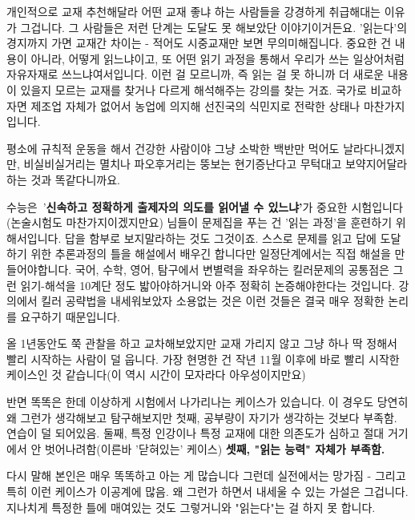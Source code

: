 개인적으로 교재 추천해달라 어떤 교재 좋냐 하는 사람들을 강경하게 취급해대는 이유가 그겁니다.
그 사람들은 저런 단계는 도달도 못 해보았단 이야기이거든요. '읽는다'의 경지까지 가면 교재간 차이는 - 적어도 시중교재만 보면 무의미해집니다.
중요한 건 내용이 아니라, 어떻게 읽느냐이고, 또 어떤 읽기 과정을 통해서 우리가 쓰는 일상어처럼 자유자재로 쓰느냐여서입니다.
이런 걸 모르니까, 즉 읽는 걸 못 하니까 더 새로운 내용이 있을지 모르는 교재를 찾거나 다르게 해석해주는 강의를 찾는 거죠.
국가로 비교하자면 제조업 자체가 없어서 농업에 의지해 선진국의 식민지로 전락한 상태나 마찬가지입니다.
\vspace{5mm}

평소에 규칙적 운동을 해서 건강한 사람이야 그냥 소박한 백반만 먹어도 날라다니겠지만,
비실비실거리는 멸치나 파오후거리는 뚱보는 현기증난다고 무턱대고 보약지어달라하는 것과 똑같다니까요.
\vspace{5mm}

수능은 '\textbf{신속하고 정확하게 출제자의 의도를 읽어낼 수 있느냐'}가 중요한 시험입니다(논술시험도 마찬가지이겠지만요)
님들이 문제집을 푸는 건 '읽는 과정'을 훈련하기 위해서입니다. 답을 함부로 보지말라하는 것도 그것이죠.
스스로 문제를 읽고 답에 도달하기 위한 추론과정의 틀을 해설에서 배우긴 합니다만 일정단계에서는 직접 해설을 만들어야합니다.
국어, 수학, 영어, 탐구에서 변별력을 좌우하는 킬러문제의 공통점은
그런 읽기-해석을 10계단 정도 밟아야하거니와 아주 정확히 논증해야한다는 것입니다.
강의에서 킬러 공략법을 내세워보았자 소용없는 것은 이런 것들은 결국 매우 정확한 논리를 요구하기 때문입니다.
\vspace{5mm}

올 1년동안도 쭉 관찰을 하고 교차해보았지만
교재 가리지 않고 그냥 하나 딱 정해서 빨리 시작하는 사람이 덜 웁니다.
가장 현명한 건 작년 11월 이후에 바로 빨리 시작한 케이스인 것 같습니다(이 역시 시간이 모자라다 아우성이지만요)
\vspace{5mm}

반면 똑똑은 한데 이상하게 시험에서 나가리나는 케이스가 있습니다. 이 경우도 당연히 왜 그런가 생각해보고 탐구해보지만
첫째, 공부량이 자기가 생각하는 것보다 부족함. 연습이 덜 되어있음.
둘째, 특정 인강이나 특정 교재에 대한 의존도가 심하고 절대 거기에서 안 벗어나려함(이른바 '닫혀있는' 케이스)
\textbf{셋째, "읽는 능력" 자체가 부족함.}
\vspace{5mm}

다시 말해 본인은 매우 똑똑하고 아는 게 많습니다
그런데 실전에서는 망가짐 - 그리고 특히 이런 케이스가 이공계에 많음.
왜 그런가 하면서 내세울 수 있는 가설은 그겁니다. 지나치게 특정한 틀에 매여있는 것도 그렇거니와
"읽는다"는 걸 하지 못 합니다.
\vspace{5mm}

